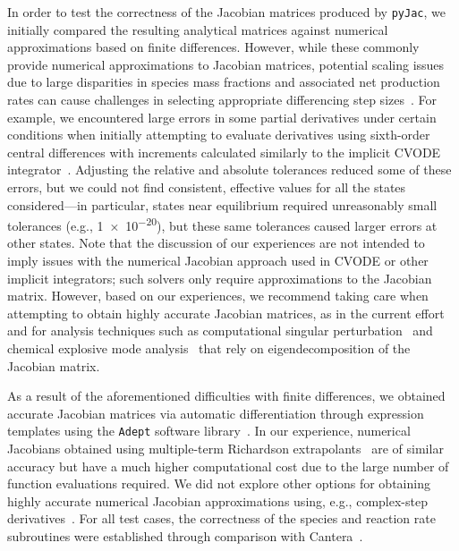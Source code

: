 \documentclass[preprint,12pt]{elsarticle}
\begin{document}
{In order to test the correctness of the Jacobian matrices produced by \texttt{pyJac}, we initially compared the resulting analytical matrices against numerical approximations based on finite differences.
However, while these commonly provide numerical approximations to Jacobian matrices, potential scaling issues due to large disparities in species mass fractions and associated net production rates can cause challenges in selecting appropriate differencing step sizes~\cite{Shampine:1994aa}.
For example, we encountered large errors in some partial derivatives under certain conditions when initially attempting to evaluate derivatives using sixth-order central differences with increments calculated similarly to the implicit CVODE integrator~\cite{Hindmarsh:2005hg}.
Adjusting the relative and absolute tolerances reduced some of these errors, but we could not find consistent, effective values for all the states considered---in particular, states near equilibrium required unreasonably small tolerances (e.g., \num{1e-20}), but these same tolerances caused larger errors at other states.
Note that the discussion of our experiences are not intended to imply issues with the numerical Jacobian approach used in CVODE or other implicit integrators; such solvers only require approximations to the Jacobian matrix.
However, based on our experiences, we recommend taking care when attempting to obtain highly accurate Jacobian matrices, as in the current effort and for analysis techniques such as computational singular perturbation~\cite{Lam:1988wc,Lam:1993ub,Lam:1994ws,Lam:2007jq} and chemical explosive mode analysis~\cite{LU:2010hp,Luo:2012hk,Shan:2012dy} that rely on eigendecomposition of the Jacobian matrix.

As a result of the aforementioned difficulties with finite differences, we obtained accurate Jacobian matrices via automatic differentiation through expression templates using the \texttt{Adept} software library~\cite{hogan2014fast,adept-v11}.
In our experience, numerical Jacobians obtained using multiple-term Richardson extrapolants~\cite{Richardson:1911cl,Lyness:1966aa,Lyness:1969bt} are of similar accuracy but have a much higher computational cost due to the large number of function evaluations required.
We did not explore other options for obtaining highly accurate numerical Jacobian approximations using, e.g., complex-step derivatives~\cite{Martins:2003fv,Shampine:2007gw,Ridout:2009fn}.
For all test cases, the correctness of the species and reaction rate subroutines were established through comparison with Cantera~\cite{Goodwin:2015aa}.

}
\end{document}
